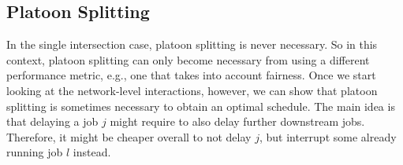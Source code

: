\documentclass{article}
\theoremstyle{definition}
\begin{document}
\subsection{Platoon Splitting}

In the single intersection case, platoon splitting is never necessary. So in
this context, platoon splitting can only become necessary from using a different
performance metric, e.g., one that takes into account fairness. Once we start
looking at the network-level interactions, however, we can show that platoon
splitting is sometimes necessary to obtain an optimal schedule. The main idea is
that delaying a job $j$ might require to also delay further downstream jobs.
Therefore, it might be cheaper overall to not delay $j$, but interrupt some
already running job $l$ instead.




\end{document}
